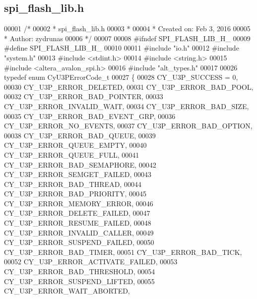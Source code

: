 \subsection{spi\+\_\+flash\+\_\+lib.\+h}
\label{spi__flash__lib_8h_source}

\begin{DoxyCode}
00001 \textcolor{comment}{/*}
00002 \textcolor{comment}{ * spi\_flash\_lib.h}
00003 \textcolor{comment}{ *}
00004 \textcolor{comment}{ *  Created on: Feb 3, 2016}
00005 \textcolor{comment}{ *      Author: zydrunas}
00006 \textcolor{comment}{ */}
00007 
00008 \textcolor{preprocessor}{#ifndef SPI\_FLASH\_LIB\_H\_}
00009 \textcolor{preprocessor}{#define SPI\_FLASH\_LIB\_H\_}
00010 
00011 \textcolor{preprocessor}{#include "io.h"}
00012 \textcolor{preprocessor}{#include "system.h"}
00013 \textcolor{preprocessor}{#include <stdint.h>}
00014 \textcolor{preprocessor}{#include <string.h>}
00015 \textcolor{preprocessor}{#include <altera_avalon_spi.h>}
00016 \textcolor{preprocessor}{#include "alt_types.h"}
00017 
00026 \textcolor{keyword}{typedef} \textcolor{keyword}{enum} CyU3PErrorCode_t
00027 \{
00028     CY_U3P_SUCCESS = 0,                 
00030     CY_U3P_ERROR_DELETED,               
00031     CY_U3P_ERROR_BAD_POOL,              
00032     CY_U3P_ERROR_BAD_POINTER,           
00033     CY_U3P_ERROR_INVALID_WAIT,          
00034     CY_U3P_ERROR_BAD_SIZE,              
00035     CY_U3P_ERROR_BAD_EVENT_GRP,         
00036     CY_U3P_ERROR_NO_EVENTS,             
00037     CY_U3P_ERROR_BAD_OPTION,            
00038     CY_U3P_ERROR_BAD_QUEUE,             
00039     CY_U3P_ERROR_QUEUE_EMPTY,           
00040     CY_U3P_ERROR_QUEUE_FULL,            
00041     CY_U3P_ERROR_BAD_SEMAPHORE,         
00042     CY_U3P_ERROR_SEMGET_FAILED,         
00043     CY_U3P_ERROR_BAD_THREAD,            
00044     CY_U3P_ERROR_BAD_PRIORITY,          
00045     CY_U3P_ERROR_MEMORY_ERROR,          
00046     CY_U3P_ERROR_DELETE_FAILED,         
00047     CY_U3P_ERROR_RESUME_FAILED,         
00048     CY_U3P_ERROR_INVALID_CALLER,        
00049     CY_U3P_ERROR_SUSPEND_FAILED,        
00050     CY_U3P_ERROR_BAD_TIMER,             
00051     CY_U3P_ERROR_BAD_TICK,              
00052     CY_U3P_ERROR_ACTIVATE_FAILED,       
00053     CY_U3P_ERROR_BAD_THRESHOLD,         
00054     CY_U3P_ERROR_SUSPEND_LIFTED,        
00055     CY_U3P_ERROR_WAIT_ABORTED,          

\end{DoxyCode}
